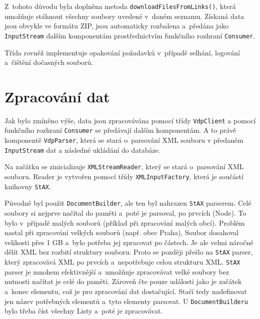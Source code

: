 Z~tohoto důvodu byla doplněna metoda \texttt{downloadFilesFromLinks()}, která umožňuje stáhnout všechny soubory uvedené v~daném seznamu.  
Získaná data jsou obvykle ve formátu ZIP, jsou automaticky rozbalena a~předána jako \texttt{InputStream} dalším komponentám  
prostřednictvím funkčního rozhraní \texttt{Consumer}.  

Třída rovněž implementuje opakování požadavků v~případě selhání, logování a~čištění dočasných souborů.

\section{Zpracování dat}
Jak bylo zmíněno výše, data jsou zpracovávána pomocí třídy \texttt{VdpClient} 
a pomocí funkčního rozhraní \texttt{Consumer} se předávají dalším komponentám.
A to právě komponentě \texttt{VdpParser}, která se stará o~parsování XML souboru v předaném \texttt{InputStream} 
dat a následné ukládání do databáze.

Na začátku se zinicializuje \texttt{XMLStreamReader}, který se stará o~parsování XML souboru. 
Reader je vytvořen pomocí třídy \texttt{XMLInputFactory}, která je součástí \\ knihovny \texttt{StAX}.

Původně byl použit \texttt{DocumentBuilder}, ale ten byl nahrazen \texttt{StAX} parserem.
Celé soubory si nejprve načítal do paměti a~poté je parsoval, po prvcích (Node).
To bylo v~případě malých souborů (příklad při zpracování malých obcí). 
Problém nastal při zpracování velkých souborů (např. obec Praha),
Soubor dosahoval velikosti přes 1 GB a~bylo potřeba jej zpracovat po částech.
Je ale velmi náročné dělit XML bez rozbití struktury souboru.
Proto se později přešlo na \texttt{StAX} parser, který zpracovává XML po prvcích a~nepotřebuje celou strukturu XML.
\texttt{StAX} parser je mnohem efektivnější a~umožňuje zpracovávat velké soubory bez nutnosti načítat je celé do paměti.
Zároveň čte pouze události jako je začátek a~konec elementu, což je pro zpracování dat dostačující.
Stačí tedy nadefinovat jen název potřebných elementů a~tyto elementy parsovat.
U \texttt{DocumentBuilderu} bylo třeba číst všechny Listy a~poté je zpracovávat.

